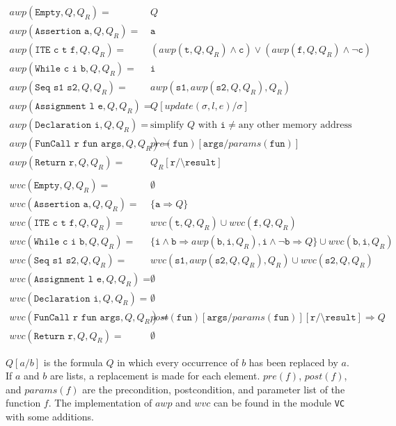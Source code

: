 \documentclass[12pt]{article}
\begin{document}
\begin{align*}
    awp(\texttt{Empty},Q,Q_{R})= & Q\\
    awp(\texttt{Assertion a},Q,Q_{R})= & \texttt{a}\\
    awp(\texttt{ITE c t f},Q,Q_{R})= & (awp(\texttt{t},Q,Q_{R})\wedge\texttt{c})\vee(awp(\texttt{f},Q,Q_{R})\wedge\lnot\texttt{c})\\
    awp(\texttt{While c i b},Q,Q_{R})= & \texttt{i}\\
    awp(\texttt{Seq s1 s2},Q,Q_{R})= & awp(\texttt{s1},awp(\texttt{s2},Q,Q_{R}),Q_{R})\\
    awp(\texttt{Assignment l e},Q,Q_{R})= & Q[update(\sigma,l,e)/\sigma]\\
    awp(\texttt{Declaration i},Q,Q_{R})= & \text{simplify }Q\text{ with }\texttt{i}\neq\text{any other memory address}\\
    awp(\texttt{FunCall r fun args},Q,Q_{R})= & pre(\texttt{fun})[\texttt{args}/params(\texttt{fun})]\\
    awp(\texttt{Return r},Q,Q_{R})= & Q_{R}[\texttt{r}/\texttt{\textbackslash result}]\\
    \\
    wvc(\texttt{Empty},Q,Q_{R})= & \emptyset\\
    wvc(\texttt{Assertion a},Q,Q_{R})= & \{\texttt{a}\Rightarrow Q\}\\
    wvc(\texttt{ITE c t f},Q,Q_{R})= & wvc(\texttt{t},Q,Q_{R})\cup wvc(\texttt{f},Q,Q_{R})\\
    wvc(\texttt{While c i b},Q,Q_{R})= & \{\texttt{i}\wedge\texttt{b}\Rightarrow awp(\texttt{b},\texttt{i},Q_{R}),\texttt{i}\wedge\lnot\texttt{b}\Rightarrow Q\}\cup wvc(\texttt{b},\texttt{i},Q_{R})\\
    wvc(\texttt{Seq s1 s2},Q,Q_{R})= & wvc(\texttt{s1},awp(\texttt{s2},Q,Q_{R}),Q_{R})\cup wvc(\texttt{s2},Q,Q_{R})\\
    wvc(\texttt{Assignment l e},Q,Q_{R})= & \emptyset\\
    wvc(\texttt{Declaration i},Q,Q_{R})= & \emptyset\\
    wvc(\texttt{FunCall r fun args},Q,Q_{R})= & post(\texttt{fun})[\texttt{args}/params(\texttt{fun})][\texttt{r}/\texttt{\textbackslash result}]\Rightarrow Q\\
    wvc(\texttt{Return r},Q,Q_{R})= & \emptyset
\end{align*}

$Q[a/b]$ is the formula $Q$ in which every occurrence of $b$ has been replaced by $a$.
If $a$ and $b$ are lists, a replacement is made for each element.
$pre(f)$, $post(f)$, and $params(f)$ are the precondition, postcondition, and parameter list of the function $f$.
The implementation of $awp$ and $wvc$ can be found in the module \texttt{VC} with some additions.
\end{document}
